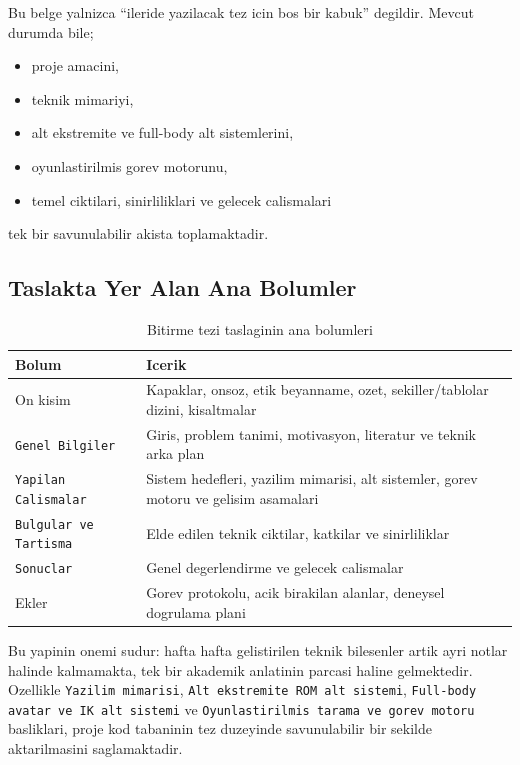 \documentclass[11pt,a4paper]{article}
\begin{document}
Bu belge yalnizca ``ileride yazilacak tez icin bos bir kabuk'' degildir.
Mevcut durumda bile;

\begin{itemize}[nosep]
    \item proje amacini,
    \item teknik mimariyi,
    \item alt ekstremite ve full-body alt sistemlerini,
    \item oyunlastirilmis gorev motorunu,
    \item temel ciktilari, sinirliliklari ve gelecek calismalari
\end{itemize}

tek bir savunulabilir akista toplamaktadir.

\subsection{Taslakta Yer Alan Ana Bolumler}

\begin{table}[H]
\centering
\caption{Bitirme tezi taslaginin ana bolumleri}
\label{tab:tez_bolumleri}
\renewcommand{\arraystretch}{1.22}
\begin{tabularx}{\textwidth}{lX}
\toprule
\textbf{Bolum} & \textbf{Icerik} \\
\midrule
On kisim & Kapaklar, onsoz, etik beyanname, ozet, sekiller/tablolar dizini, kisaltmalar \\
\texttt{Genel Bilgiler} & Giris, problem tanimi, motivasyon, literatur ve teknik arka plan \\
\texttt{Yapilan Calismalar} & Sistem hedefleri, yazilim mimarisi, alt sistemler, gorev motoru ve gelisim asamalari \\
\texttt{Bulgular ve Tartisma} & Elde edilen teknik ciktilar, katkilar ve sinirliliklar \\
\texttt{Sonuclar} & Genel degerlendirme ve gelecek calismalar \\
Ekler & Gorev protokolu, acik birakilan alanlar, deneysel dogrulama plani \\
\bottomrule
\end{tabularx}
\end{table}

Bu yapinin onemi sudur: hafta hafta gelistirilen teknik bilesenler artik
ayri notlar halinde kalmamakta, tek bir akademik anlatinin parcasi haline
gelmektedir. Ozellikle \texttt{Yazilim mimarisi}, \texttt{Alt ekstremite ROM alt
sistemi}, \texttt{Full-body avatar ve IK alt sistemi} ve
\texttt{Oyunlastirilmis tarama ve gorev motoru} basliklari, proje kod tabaninin
tez duzeyinde savunulabilir bir sekilde aktarilmasini saglamaktadir.
\end{document}
